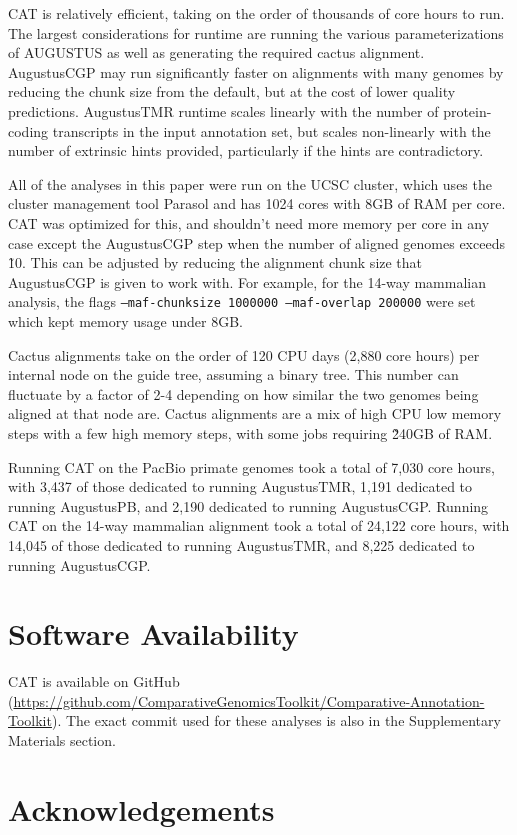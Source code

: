 \documentclass[fleqn,10pt]{wlscirep}
\begin{document}
CAT is relatively efficient, taking on the order of thousands of core hours to run. The largest considerations for runtime are running the various parameterizations of AUGUSTUS as well as generating the required cactus alignment. AugustusCGP may run significantly faster on alignments with many genomes by reducing the chunk size from the default, but at the cost of lower quality predictions. AugustusTMR runtime scales linearly with the number of protein-coding transcripts in the input annotation set, but scales non-linearly with the number of extrinsic hints provided, particularly if the hints are contradictory. 

All of the analyses in this paper were run on the UCSC cluster, which uses the cluster management tool Parasol and has 1024 cores with 8GB of RAM per core. CAT was optimized for this, and shouldn't need more memory per core in any case except the AugustusCGP step when the number of aligned genomes exceeds \~10. This can be adjusted by reducing the alignment chunk size that AugustusCGP is given to work with. For example, for the 14-way mammalian analysis, the flags \texttt{--maf-chunksize 1000000 --maf-overlap 200000} were set which kept memory usage under 8GB.

Cactus alignments take on the order of 120 CPU days (2,880 core hours) per internal node on the guide tree, assuming a binary tree. This number can fluctuate by a factor of 2-4 depending on how similar the two genomes being aligned at that node are. Cactus alignments are a mix of high CPU low memory steps with a few high memory steps, with some jobs requiring \~240GB of RAM.

Running CAT on the PacBio primate genomes took a total of 7,030 core hours, with 3,437 of those dedicated to running AugustusTMR, 1,191 dedicated to running AugustusPB, and 2,190 dedicated to running AugustusCGP. Running CAT on the 14-way mammalian alignment took a total of 24,122 core hours, with 14,045 of those dedicated to running AugustusTMR, and 8,225 dedicated to running AugustusCGP.

\section*{Software Availability}
CAT is available on GitHub (\url{https://github.com/ComparativeGenomicsToolkit/Comparative-Annotation-Toolkit}). The exact commit used for these analyses is also in the Supplementary Materials section.

\section*{Acknowledgements}
\end{document}
